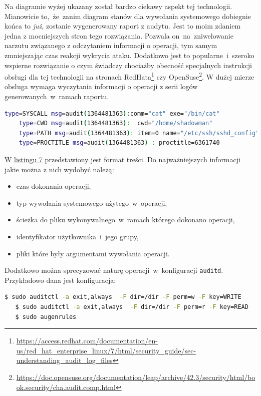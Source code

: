 Na diagramie wyżej ukazany został bardzo ciekawy aspekt tej technologii. Mianowicie to,~że~zanim diagram stanów dla wywołania systemowego dobiegnie końca to \emph{już}, zostanie wygenerowany raport z audytu. Jest to moim zdaniem jedna z mocniejszych stron tego rozwiązania. Pozwala on~na~zniwelowanie narzutu związanego z odczytaniem informacji o operacji, tym samym zmniejszając czas reakcji wykrycia ataku. Dodatkowo jest to popularne~i~szeroko wspierne rozwiązanie o czym świadczy chociażby obecność specjalnych instrukcji obsługi dla tej technologii na stronach RedHata\footnote{\url{https://access.redhat.com/documentation/en-us/red_hat_enterprise_linux/7/html/security_guide/sec-understanding_audit_log_files}} czy OpenSuse\footnote{\url{https://doc.opensuse.org/documentation/leap/archive/42.3/security/html/book.security/cha.audit.comp.html}}.
W dużej mierze obsługa wymaga wyczytania informacji o operacji z serii logów generowanych~w~ramach raportu.
\begin{lstlisting}[language=bash,
    backgroundcolor=\color{EEGold!5!white},
    caption={Przykładowy format treści raportu z audytu. Na potrzeby estetyki prezentacji wyciąłem z niego trochę informacji.},
    label={lst:audit}]
    type=SYSCALL msg=audit(1364481363):comm="cat" exe="/bin/cat"
    type=CWD msg=audit(1364481363):  cwd="/home/shadowman"
    type=PATH msg=audit(1364481363): item=0 name="/etc/ssh/sshd_config" 
    type=PROCTITLE msg=audit(1364481363) : proctitle=6361740
\end{lstlisting}
W \hyperref[lst:audit]{listingu 7} przedstawiony jest format treści. Do najważniejszych informacji jakie można z nich wydobyć należą:
\begin{itemize}
    \item czas dokonania operacji,
    \item typ wywołania systemowego użytego~w~operacji,
    \item ścieżka do pliku wykonywalnego~w~ramach którego dokonano operacji,
    \item identyfikator użytkownika~i~jego grupy,
    \item pliki które były argumentami wywołania operacji.
\end{itemize}
Dodatkowo można sprecyzować naturę operacji~w~konfiguracji \texttt{auditd}. Przykładowo dana jest konfiguracja:
\begin{lstlisting}[language=bash,
    backgroundcolor=\color{EEGold!5!white},
    caption={Konfiguracja zasad audytowania.}
    ]
   $ sudo auditctl -a exit,always  -F dir=/dir -F perm=w -F key=WRITE
   $ sudo auditctl -a exit,always  -F dir=/dir -F perm=r -F key=READ
   $ sudo augenrules 
\end{lstlisting}
